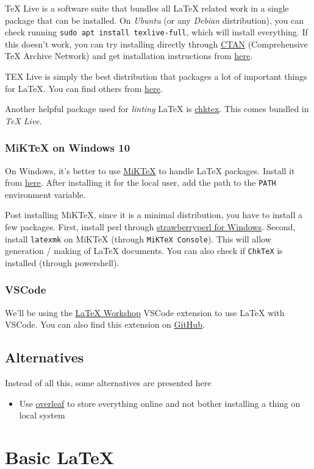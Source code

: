 \documentclass[]{article}
\begin{document}
TeX Live is a software suite that bundles all \LaTeX{} related work in a single package that can be installed. On \emph{Ubuntu} (or any \emph{Debian} distribution), you can check running \texttt{sudo apt install texlive-full}, which will install everything.
If this doesn't work, you can try installing directly through \href{https://ctan.org/pkg/texlive}{CTAN} (Comprehensive \TeX{} Archive Network) and get installation instructions from \href{https://www.tug.org/texlive/}{here}.

\noindent TEX Live is simply the best distribution that packages a lot of important things for \LaTeX{}. You can find others from \href{https://www.latex-project.org/get/}{here}.

\noindent Another helpful package used for \emph{linting} \LaTeX{} is \href{https://www.nongnu.org/chktex/}{chktex}. This comes bundled in \emph{TeX Live}.

\subsubsection*{MiKTeX on Windows 10}

On Windows, it's better to use \href{https://miktex.org/}{MiKTeX} to handle \LaTeX{} packages. Install it from \href{https://miktex.org/download}{here}. After installing it for the local user, add the path to the \texttt{PATH} environment variable.

\noindent Post installing MiKTeX, since it is a minimal distribution, you have to install a few packages. First, install perl through \href{https://strawberryperl.com/}{strawberryperl for Windows}. Second, install \texttt{latexmk} on MiKTeX (through \texttt{MiKTeX Console}). This will allow generation / making of \LaTeX{} documents. You can also check if \texttt{ChkTeX} is installed (through powershell).

\subsubsection*{VSCode}

We'll be using the \href{https://marketplace.visualstudio.com/items?itemName=James-Yu.latex-workshop}{LaTeX Workshop} VSCode extension to use \LaTeX{} with VSCode. You can also find this extension on \href{https://github.com/James-Yu/LaTeX-Workshop}{GitHub}.

\subsection{Alternatives}

Instead of all this, some alternatives are presented here

\begin{itemize}
    \item Use \href{https://www.overleaf.com/}{overleaf} to store everything online and not bother installing a thing on local system
\end{itemize}

\section{Basic \LaTeX{}}

\end{document}
